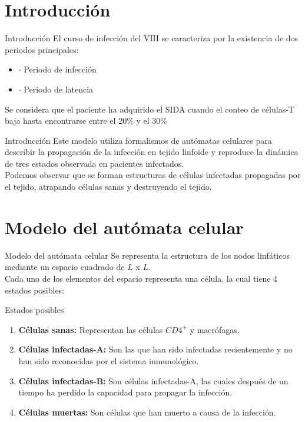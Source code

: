 \documentclass[12pt, compress, titleprogressbar]{beamer}
\begin{document}
\renewcommand{\tablename}{Tabla}
	\maketitle

	\section{Introducción}
	\begin{frame}{Introducción}
		El curso de infección del VIH se caracteriza por la existencia de dos periodos principales:
		\begin{itemize}
			\item $\cdot$ Periodo de infección
			\item $\cdot$ Periodo de latencia
		\end{itemize}

		Se considera que el paciente ha adquirido el SIDA cuando el conteo de células-T baja hasta encontrarse entre el 20\% y el 30\%
	\end{frame}

	\begin{frame}{Introducción}
		Este modelo utiliza formalismos de autómatas celulares para describir la propagación de la infección en tejido linfoide y reproduce la dinámica de tres estados observada en pacientes infectados.\\

		Podemos observar que se forman estructuras de células infectadas propagadas por el tejido, atrapando células sanas y destruyendo el tejido.
	\end{frame}

	\section{Modelo del autómata celular}
	\begin{frame}{Modelo del autómata celular}
		Se representa la estructura de los nodos linfáticos mediante un espacio cuadrado de $L$ x $L$.\\

		Cada uno de los elementos del espacio representa una célula, la cual tiene 4 estados posibles:
	\end{frame}

	\begin{frame}{Estados posibles}
		\begin{enumerate}
			\item \textbf{Células sanas:} Representan las células $CD4^{+}$ y macrófagas.
			\item \textbf{Células infectadas-A:} Son las que han sido infectadas recientemente y no han sido reconocidas por el sistema inmunológico.
			\item \textbf{Células infectadas-B:} Son células infectadas-A, las cuales después de un tiempo ha perdido la capacidad para propagar la infección.
			\item \textbf{Células muertas:} Son células que han muerto a causa de la infección.
		\end{enumerate}
	\end{frame}
\end{document}
